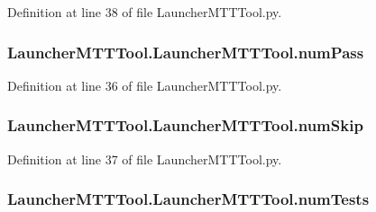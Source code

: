 Definition at line 38 of file Launcher\-M\-T\-T\-Tool.\-py.

\hypertarget{class_launcher_m_t_t_tool_1_1_launcher_m_t_t_tool_a92a3dc1fd9b7d2e9129d3a0968a871eb}{
\subsubsection[{num\-Pass}]{\setlength{\rightskip}{0pt plus 5cm}Launcher\-M\-T\-T\-Tool.\-Launcher\-M\-T\-T\-Tool.\-num\-Pass}}\label{class_launcher_m_t_t_tool_1_1_launcher_m_t_t_tool_a92a3dc1fd9b7d2e9129d3a0968a871eb}


Definition at line 36 of file Launcher\-M\-T\-T\-Tool.\-py.

\hypertarget{class_launcher_m_t_t_tool_1_1_launcher_m_t_t_tool_affd7de54ccbc2c7f78b4afa06728f5e5}{
\subsubsection[{num\-Skip}]{\setlength{\rightskip}{0pt plus 5cm}Launcher\-M\-T\-T\-Tool.\-Launcher\-M\-T\-T\-Tool.\-num\-Skip}}\label{class_launcher_m_t_t_tool_1_1_launcher_m_t_t_tool_affd7de54ccbc2c7f78b4afa06728f5e5}


Definition at line 37 of file Launcher\-M\-T\-T\-Tool.\-py.

\hypertarget{class_launcher_m_t_t_tool_1_1_launcher_m_t_t_tool_a397beae73724893629842d0031c64526}{
\subsubsection[{num\-Tests}]{\setlength{\rightskip}{0pt plus 5cm}Launcher\-M\-T\-T\-Tool.\-Launcher\-M\-T\-T\-Tool.\-num\-Tests}}\label{class_launcher_m_t_t_tool_1_1_launcher_m_t_t_tool_a397beae73724893629842d0031c64526}



